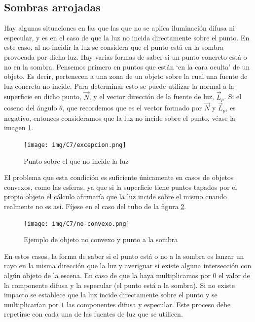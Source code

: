 \subsection{Sombras arrojadas}
\label{subsection:sombras}

Hay algunas situaciones en las que las que no se aplica iluminación difusa ni especular, y es en el caso de que la luz no incida directamente sobre el punto. En este caso, al no incidir la luz se considera que el punto está en la sombra provocada por dicha luz. Hay varias formas de saber si un punto concreto está o no en la sombra. Pensemos primero en puntos que están `en la cara oculta' de un objeto. Es decir, pertenecen a una zona de un objeto sobre la cual una fuente de luz concreta no incide. Para determinar esto se puede utilizar la normal a la superficie en dicho punto, $\vec N$, y el vector dirección de la fuente de luz, $\vec L_p$. Si el coseno del ángulo $\theta$, que recordemos que es el vector formado por $\vec N$ y $\vec L_p$, es negativo, entonces consideramos que la luz no incide sobre el punto, véase la imagen \ref{fig:excepcion}.

\begin{figure} [ht]
    \centering
    \texttt{[image: img/C7/excepcion.png]}
    \caption{Punto sobre el que no incide la luz}
    \label{fig:excepcion}
\end{figure}

El problema que esta condición es suficiente únicamente en casos de objetos convexos, como las esferas, ya que si la superficie tiene puntos tapados por el propio objeto el cálculo afirmaría que la luz incide sobre el mismo cuando realmente no es así. Fíjese en el caso del tubo de la figura \ref{fig:no-convexo}.

\begin{figure} [ht]
    \centering
    \texttt{[image: img/C7/no-convexo.png]}
    \caption{Ejemplo de objeto no convexo y punto a la sombra}
    \label{fig:no-convexo}
\end{figure}

En estos casos, la forma de saber si el punto está o no a la sombra es lanzar un rayo en la misma dirección que la luz y averiguar si existe alguna intersección con algún objeto de la escena. En caso de que la haya multiplicamos por $0$ el valor de la componente difusa y la especular (el punto está a la sombra). Si no existe impacto se establece que la luz incide directamente sobre el punto y se multiplicarían por $1$ las componentes difusa y especular. Este proceso debe repetirse con cada una de las fuentes de luz que se utilicen.

